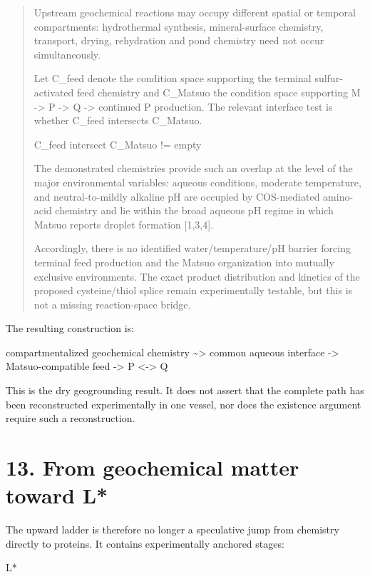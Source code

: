 \documentclass[11pt]{article}
\begin{document}
\begin{quote}
Upstream geochemical reactions may occupy different spatial or temporal compartments: hydrothermal synthesis, mineral-surface chemistry, transport, drying, rehydration and pond chemistry need not occur simultaneously.

Let C\_feed denote the condition space supporting the terminal sulfur-activated feed chemistry and C\_Matsuo the condition space supporting M -\textgreater{} P -\textgreater{} Q -\textgreater{} continued P production. The relevant interface test is whether C\_feed intersects C\_Matsuo.

C\_feed intersect C\_Matsuo != empty

The demonstrated chemistries provide such an overlap at the level of the major environmental variables: aqueous conditions, moderate temperature, and neutral-to-mildly alkaline pH are occupied by COS-mediated amino-acid chemistry and lie within the broad aqueous pH regime in which Matsuo reports droplet formation {[}1,3,4{]}.

Accordingly, there is no identified water/temperature/pH barrier forcing terminal feed production and the Matsuo organization into mutually exclusive environments. The exact product distribution and kinetics of the proposed cysteine/thiol splice remain experimentally testable, but this is not a missing reaction-space bridge.
\end{quote}

The resulting construction is:

compartmentalized geochemical chemistry \textasciitilde\textgreater{} common aqueous interface -\textgreater{} Matsuo-compatible feed -\textgreater{} P \textless-\textgreater{} Q

This is the dry geogrounding result. It does not assert that the complete path has been reconstructed experimentally in one vessel, nor does the existence argument require such a reconstruction.

\hypertarget{from-geochemical-matter-toward-l}{%
\section*{13. From geochemical matter toward L*}\label{from-geochemical-matter-toward-l}}

The upward ladder is therefore no longer a speculative jump from chemistry directly to proteins. It contains experimentally anchored stages:

L*
\end{document}
